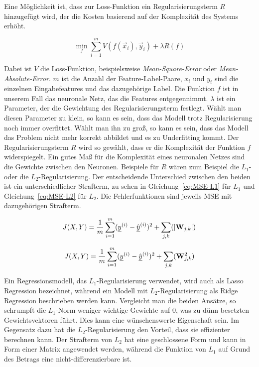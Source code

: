 Eine Möglichkeit ist, dass zur Loss-Funktion ein Regularisierungsterm \(R\) hinzugefügt wird, 
der die Kosten basierend auf der Komplexität des Systems erhöht.
 
\begin{equation}
	\min_f \sum\limits_{i=1}^{m} V(f(\vec{x}_i), \vec{y}_i) + \lambda R(f)
\end{equation} 
 
Dabei ist \(V\) die Loss-Funktion, beispielsweise \textit{Mean-Square-Error} oder \textit{Mean-Absolute-Error}.
\(m\) ist die Anzahl der Feature-Label-Paare,
\(x_i\) und \(y_i\) sind die einzelnen Eingabefeatures und das dazugehörige Label.
Die Funktion \(f\) ist in unserem Fall das neuronale Netz, das die Features entgegennimmt.
\(\lambda\) ist ein Parameter, der die Gewichtung des Regularisierungsterm festlegt.
Wählt man diesen Parameter zu klein, so kann es sein, dass das Modell trotz Regularisierung noch immer overfittet.
Wählt man ihn zu groß, so kann es sein, dass das Modell das Problem nicht mehr korrekt abbildet und es zu Underfitting kommt.
Der Regularisierungsterm \(R\) wird so gewählt, dass er die Komplexität der Funktion \(f\) widerspiegelt.
Ein gutes Maß für die Komplexität eines neuronalen Netzes sind die Gewichte zwischen den Neuronen.
Beispiele für \(R\) wären zum Beispiel die \(L_1\)- oder die \(L_2\)-Regularisierung. %
Der entscheidende Unterschied zwischen den beiden ist ein unterschiedlicher Strafterm, zu sehen in Gleichung~\eqref{eq:MSE-L1} für \(L_1\) und Gleichung~\eqref{eq:MSE-L2} für \(L_2\). 
Die Fehlerfunktionen sind jeweils MSE mit dazugehörigen Strafterm.

\begin{equation} \label{eq:MSE-L1}
	J(X, Y) = \frac{1}{m} \sum_{i=1}^{m} ({\underline{y}}^{(i)} - \hat{{\underline{y}}}^{(i)})^2 + \sum_{j, k} (|{{\mathbf{W}}}_{j,k}|)
\end{equation} 

\begin{equation} \label{eq:MSE-L2}
	J(X, Y) = \frac{1}{m} \sum_{i=1}^{m} ({\underline{y}}^{(i)} - \hat{{\underline{y}}}^{(i)})^2 + \sum_{j, k} ({{\mathbf{W}}}_{j,k}^2)
\end{equation} 


Ein Regressionsmodell, das \(L_1\)-Regularisierung verwendet, wird auch als Lasso Regression bezeichnet, 
während ein Modell mit \(L_2\)-Regularisierung als Ridge Regression beschrieben werden kann.
Vergleicht man die beiden Ansätze, so schrumpft die \(L_1\)-Norm weniger wichtige Gewichte auf 0, was zu dünn besetzten Gewichtsvektoren führt.
Dies kann eine wünschenswerte Eigenschaft sein.
Im Gegensatz dazu hat die \(L_2\)-Regularisierung den Vorteil, dass sie effizienter berechnen kann.
Der Strafterm von \(L_2\) hat eine geschlossene Form und kann in Form einer Matrix angewendet werden, während die Funktion von \(L_1\) auf Grund des Betrags eine nicht-differenzierbare ist.


